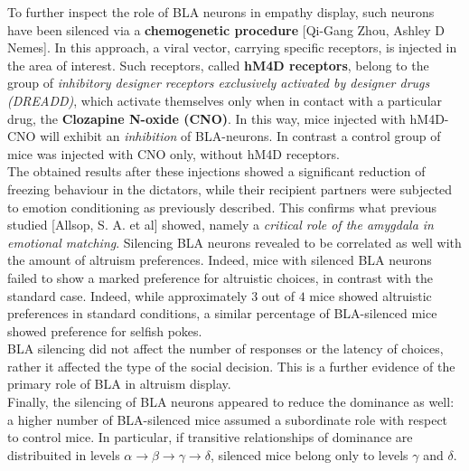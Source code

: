\documentclass[a4paper]{article}
\begin{document}
To further inspect the role of BLA neurons in empathy display, such neurons have been silenced via a \textbf{chemogenetic procedure} [Qi-Gang Zhou, Ashley D Nemes]. In this approach, a viral vector, carrying specific receptors, is injected in the area of interest. Such receptors, called  \textbf{hM4D receptors}, belong to the group of \textit{inhibitory designer receptors exclusively activated by designer drugs (DREADD)}, which activate themselves only when in contact with a particular drug, the \textbf{Clozapine N-oxide (CNO)}. In this way, mice injected with hM4D-CNO will exhibit an \textit{inhibition} of BLA-neurons. In contrast a control group of mice was injected with CNO only, without hM4D receptors.\\
The obtained results after these injections showed a significant reduction of freezing behaviour in the dictators, while their recipient partners were subjected to emotion conditioning as previously described. This confirms what previous studied [Allsop, S. A. et al] showed, namely a \textit{critical role of the amygdala in emotional matching}. Silencing BLA neurons revealed to be correlated as well with the amount of altruism preferences. Indeed, mice with silenced BLA neurons failed to show a marked preference for altruistic choices, in contrast with the standard case. Indeed, while approximately $3$ out of $4$ mice showed altruistic preferences in standard conditions, a similar percentage of BLA-silenced mice showed preference for selfish pokes.\\
BLA silencing did not affect the number of responses or the latency of choices, rather it affected the type of the social decision. This is a further evidence of the primary role of BLA in altruism display.
\\
Finally, the silencing of BLA neurons appeared to reduce the dominance as well: a higher number of BLA-silenced mice assumed a subordinate role with respect to control mice. In particular, if transitive relationships of dominance are distribuited in levels $ \alpha \rightarrow \beta \rightarrow \gamma \rightarrow \delta $, silenced mice belong only to levels $ \gamma $ and $ \delta $.
\end{document}
